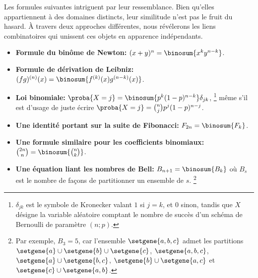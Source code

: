 Les formules suivantes intriguent par leur ressemblance. Bien qu'elles appartiennent à des domaines distincts, leur similitude n’est pas le fruit du hasard. À travers deux approches différentes, nous révélerons les liens combinatoires qui unissent ces objets en apparence indépendants.
%
\begin{itemize}
    \item \textbf{Formule du binôme de Newton:}
    $(x + y)^n = \binosum{x^k y^{n-k}}$.


    \item \textbf{Formule de dérivation de Leibniz:}
    $(fg)^{(n)}(x) = \binosum{f^{(k)}(x) g^{(n-k)}(x)}$.


    \item \textbf{Loi binomiale:}
    $\proba{X = j} = \binosum{p^k (1 - p)^{n-k}} \delta_{jk}$,%
    \footnote{
    	$\delta_{jk}$ est le symbole de Kronecker valant $1$ si $j=k$, et $0$ sinon,
		tandis que
		$X$ désigne la variable aléatoire comptant le nombre de succès d'un schéma de Bernoulli de paramètre $(n ; p)$.
    }
    même s'il est d'usage de juste écrire
    $\proba{X = j} =\binom{n}{j} p^j (1 - p)^{n-j}$.


    \item \textbf{Une identité portant sur la suite de Fibonacci:}
    $F_{2n} = \binosum{F_k}$.


    \item \textbf{Une formule similaire pour les coefficients binomiaux:}
    $\binom{2n}{n} = \binosum{\binom{n}{k}}$.


    \item \textbf{Une équation liant les nombres de Bell:}
    $B_{n+1} = \binosum{B_k}$ où $B_s$ est le nombre de façons de partitionner un ensemble de $s$.%
    \footnote{
    	Par exemple,
    	$B_3 = 5$,
    	car l'ensemble $\setgene{ a , b , c }$ admet les partitions
    	$\setgene{ a } \cup \setgene{ b } \cup \setgene{ c }$,
    	$\setgene{ a , b , c }$,
    	$\setgene{ a } \cup \setgene{ b , c }$,
    	$\setgene{ b } \cup \setgene{ a , c }$ et
    	$\setgene{ c } \cup \setgene{ a , b }$.
	}
\end{itemize}